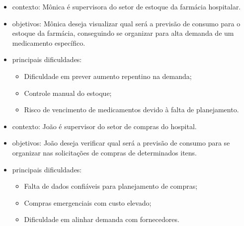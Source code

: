 \documentclass[12pt,a4paper]{article}
\begin{document}
\begin{itemize}
    \item contexto: Mônica é supervisora do setor de estoque da farmácia hospitalar.
    \item objetivos: Mônica deseja visualizar qual será a previsão de consumo para o estoque da farmácia, conseguindo se organizar para alta demanda de um medicamento específico.
    \item principais dificuldades:
          \begin{itemize}
              \item Dificuldade em prever aumento repentino na demanda;
              \item Controle manual do estoque;
              \item Risco de vencimento de medicamentos devido à falta de planejamento.
          \end{itemize}
\end{itemize}

\begin{itemize}
    \item contexto: João é supervisor do setor de compras do hospital.
    \item objetivos: João deseja verificar qual será a previsão de consumo para se organizar nas solicitações de compras de determinados itens.
    \item principais dificuldades:
          \begin{itemize}
              \item Falta de dados confiáveis para planejamento de compras;
              \item Compras emergenciais com custo elevado;
              \item Dificuldade em alinhar demanda com fornecedores.
          \end{itemize}
\end{itemize}
\end{document}
